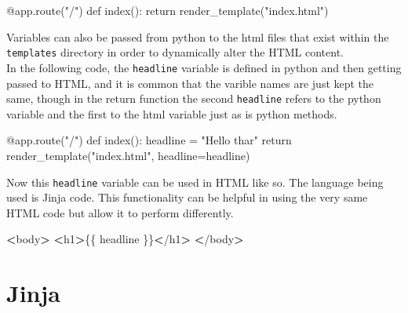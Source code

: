 \documentclass[]{book}
\newenvironment{Shaded}{\begin{snugshade}}{\end{snugshade}}
\newcommand{\StringTok}[1]{\textcolor[rgb]{0.31,0.60,0.02}{#1}}
\newcommand{\OperatorTok}[1]{\textcolor[rgb]{0.81,0.36,0.00}{\textbf{#1}}}
\newcommand{\BuiltInTok}[1]{#1}
\newcommand{\ExtensionTok}[1]{#1}
\newcommand{\NormalTok}[1]{#1}
\begin{document}
\begin{Shaded}
\begin{Highlighting}[]
\ExtensionTok{@app.route}\NormalTok{(}\StringTok{"/"}\NormalTok{)}
\ExtensionTok{def}\NormalTok{ index()}\BuiltInTok{:}
    \BuiltInTok{return}\NormalTok{ render_template(}\StringTok{"index.html"}\NormalTok{)}
\end{Highlighting}
\end{Shaded}

Variables can also be passed from python to the html files that exist
within the \texttt{templates} directory in order to dynamically alter
the HTML content.\\
In the following code, the \texttt{headline} variable is defined in
python and then getting passed to HTML, and it is common that the
varible names are just kept the same, though in the return function the
second \texttt{headline} refers to the python variable and the first to
the html variable just as is python methods.

\begin{Shaded}
\begin{Highlighting}[]
\ExtensionTok{@app.route}\NormalTok{(}\StringTok{"/"}\NormalTok{)}
\ExtensionTok{def}\NormalTok{ index()}\BuiltInTok{:}
    \ExtensionTok{headline}\NormalTok{ = }\StringTok{"Hello thar"}
    \BuiltInTok{return}\NormalTok{ render_template(}\StringTok{"index.html"}\NormalTok{, headline=headline)}
\end{Highlighting}
\end{Shaded}

Now this \texttt{headline} variable can be used in HTML like so. The
language being used is Jinja code. This functionality can be helpful in
using the very same HTML code but allow it to perform differently.

\begin{Shaded}
\begin{Highlighting}[]
\OperatorTok{<}\ExtensionTok{body}\OperatorTok{>}
    \OperatorTok{<}\ExtensionTok{h1}\OperatorTok{>}\NormalTok{\{\{ headline \}\}}\OperatorTok{<}\NormalTok{/}\ExtensionTok{h1}\OperatorTok{>}
\OperatorTok{<}\NormalTok{/}\ExtensionTok{body}\OperatorTok{>}
\end{Highlighting}
\end{Shaded}

\section{Jinja}\label{jinja}
\end{document}
